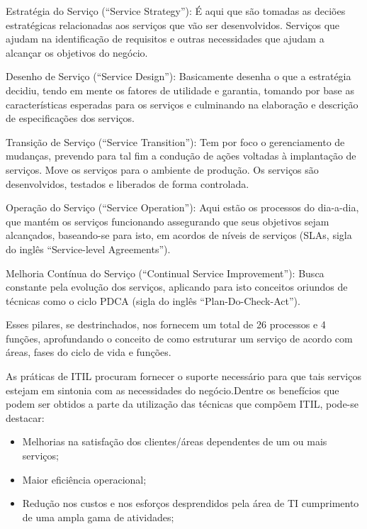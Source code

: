 \documentclass[11pt,a4paper]{article}
\begin{document}
Estratégia do Serviço (“Service Strategy”): É aqui que são tomadas as deciões estratégicas relacionadas aos serviços que vão ser desenvolvidos. Serviços que ajudam na identificação de requisitos e outras necessidades que ajudam a alcançar os objetivos do negócio.

Desenho de Serviço (“Service Design”): Basicamente desenha o que a estratégia decidiu, tendo em mente os fatores de utilidade e garantia, tomando por base as características esperadas para os serviços e culminando na elaboração e descrição de especificações dos serviços.

Transição de Serviço (“Service Transition”): Tem por foco o gerenciamento de mudanças, prevendo para tal fim a condução de ações voltadas à implantação de serviços. Move os serviços para o ambiente de produção. Os serviços são desenvolvidos, testados e liberados de forma controlada.

Operação do Serviço (“Service Operation”): Aqui estão os processos do dia-a-dia, que mantém os serviços funcionando assegurando que seus objetivos sejam alcançados, baseando-se para isto, em acordos de níveis de serviços (SLAs, sigla do inglês “Service-level Agreements”).

Melhoria Contínua do Serviço (“Continual Service Improvement”): Busca constante pela evolução dos serviços, aplicando para isto conceitos oriundos de técnicas como o ciclo PDCA (sigla do inglês “Plan-Do-Check-Act”).

\cite{itsmfservice}Esses pilares, se destrinchados, nos fornecem um total de 26 processos e 4 funções, aprofundando o conceito de como estruturar um serviço de acordo com áreas, fases do ciclo de vida e funções.



As práticas de ITIL procuram fornecer o suporte necessário para que tais serviços estejam em sintonia com as necessidades do negócio.Dentre os benefícios que podem ser obtidos a parte da utilização das técnicas que compõem ITIL, pode-se destacar:


\begin{itemize}[noitemsep]
	\item Melhorias na satisfação dos clientes/áreas dependentes de um ou mais serviços;
	\item Maior eficiência operacional;
	\item Redução nos custos e nos esforços desprendidos pela área de TI cumprimento de uma ampla gama de atividades;
\end{itemize}
\end{document}
